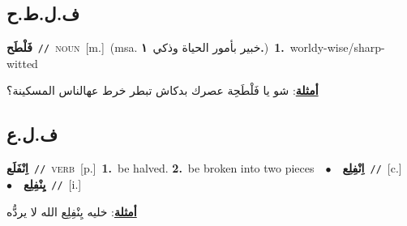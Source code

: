 \documentclass[10pt,a4paper,twoside]{article} %
\begin{document}
\begin{multicols}{2}
\vspace{-3mm}
\subsection*{\color{blue}\foreignlanguage{arabic}{ف.ل.ط.ح}\color{blue}{}} 

{\setlength\topsep{0pt}\textbf{\foreignlanguage{arabic}{فَلْطَح}}\ {\color{gray}\texttt{//}\color{black}}\ \textsc{noun}\ [m.]\ \color{gray}(msa. \foreignlanguage{arabic}{خبير بأمور الحياة وذكي}~\foreignlanguage{arabic}{\textbf{١.}})\color{black}\ \textbf{1.}~worldy-wise/sharp-witted\  \begin{flushright}\color{gray}\foreignlanguage{arabic}{\textbf{\underline{\foreignlanguage{arabic}{أمثلة}}}: شو يا فَلْطَحِة  عصرك بدكاش تبطر خرط عهالناس المسكينة؟}\end{flushright}\color{black}} \vspace{2mm}

\vspace{-3mm}
\subsection*{\color{blue}\foreignlanguage{arabic}{ف.ل.ع}\color{blue}{}} 

{\setlength\topsep{0pt}\textbf{\foreignlanguage{arabic}{اِنْفَلَع}}\ {\color{gray}\texttt{//}\color{black}}\ \textsc{verb}\ [p.]\ \textbf{1.}~be halved.  \textbf{2.}~be broken into two pieces\ \ $\bullet$\ \ \setlength\topsep{0pt}\textbf{\foreignlanguage{arabic}{اِنْفِلِع}}\ {\color{gray}\texttt{//}\color{black}}\ [c.]\ \ $\bullet$\ \ \setlength\topsep{0pt}\textbf{\foreignlanguage{arabic}{يِنْفِلِع}}\ {\color{gray}\texttt{//}\color{black}}\ [i.]\  \begin{flushright}\color{gray}\foreignlanguage{arabic}{\textbf{\underline{\foreignlanguage{arabic}{أمثلة}}}: خليه يِنْفِلِع الله لا يردُّه}\end{flushright}\color{black}} \vspace{2mm}


\end{multicols}
\end{document}

